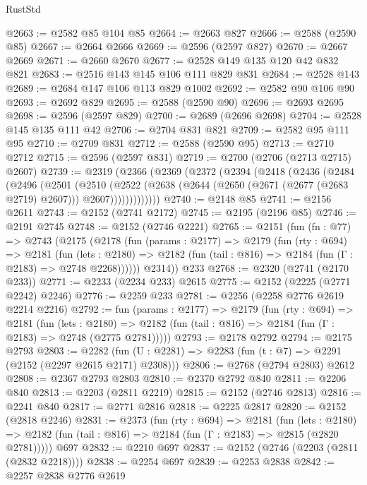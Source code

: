\begin{lexlean}{RustStd}
\begin{coremodule}
@2663 := @2582 @85 @104 @85
@2664 := @2663 @827
@2666 := @2588 (@2590 @85)
@2667 := @2664 @2666
@2669 := @2596 (@2597 @827)
@2670 := @2667 @2669
@2671 := @2660 @2670
@2677 := @2528 @149 @135 @120 @42 @832 @821
@2683 := @2516 @143 @145 @106 @111 @829 @831
@2684 := @2528 @143
@2689 := @2684 @147 @106 @113 @829 @1002
@2692 := @2582 @90 @106 @90
@2693 := @2692 @829
@2695 := @2588 (@2590 @90)
@2696 := @2693 @2695
@2698 := @2596 (@2597 @829)
@2700 := @2689 (@2696 @2698)
@2704 := @2528 @145 @135 @111 @42
@2706 := @2704 @831 @821
@2709 := @2582 @95 @111 @95
@2710 := @2709 @831
@2712 := @2588 (@2590 @95)
@2713 := @2710 @2712
@2715 := @2596 (@2597 @831)
@2719 := @2700 (@2706 (@2713 @2715) @2607)
@2739 := @2319
    (@2366
      (@2369
        (@2372
          (@2394
            (@2418
              (@2436
                (@2484
                  (@2496
                    (@2501
                      (@2510
                        (@2522
                          (@2638
                            (@2644 (@2650 (@2671 (@2677 (@2683 @2719) @2607))) @2607)))))))))))))
@2740 := @2148 @85
@2741 := @2156 @2611
@2743 := @2152 (@2741 @2172)
@2745 := @2195 (@2196 @85)
@2746 := @2191 @2745
@2748 := @2152 (@2746 @2221)
@2765 := @2151
    (fun (fn : @77) =>
    @2743
      (@2175
        (@2178
          (fun (params : @2177) =>
          @2179
            (fun (rty : @694) =>
            @2181
              (fun (lets : @2180) =>
              @2182 (fun (tail : @816) => @2184 (fun (Γ : @2183) => @2748 @2268))))))
        @2314))
    @233
@2768 := @2320 (@2741 (@2170 @233))
@2771 := @2233 (@2234 @233) @2615
@2775 := @2152 (@2225 (@2771 @2242) @2246)
@2776 := @2259 @233
@2781 := @2256 (@2258 @2776 @2619 @2214 @2216)
@2792 := fun (params : @2177) =>
  @2179
    (fun (rty : @694) =>
    @2181
      (fun (lets : @2180) =>
      @2182 (fun (tail : @816) => @2184 (fun (Γ : @2183) => @2748 (@2775 @2781)))))
@2793 := @2178 @2792
@2794 := @2175 @2793
@2803 := @2282 (fun (U : @2281) => @2283 (fun (t : @7) => @2291 (@2152 (@2297 @2615 @2171) @2308)))
@2806 := @2768 (@2794 @2803) @2612
@2808 := @2367 @2793 @2803
@2810 := @2370 @2792 @840
@2811 := @2206 @840
@2813 := @2203 (@2811 @2219)
@2815 := @2152 (@2746 @2813)
@2816 := @2241 @840
@2817 := @2771 @2816
@2818 := @2225 @2817
@2820 := @2152 (@2818 @2246)
@2831 := @2373
    (fun (rty : @694) =>
    @2181
      (fun (lets : @2180) =>
      @2182 (fun (tail : @816) => @2184 (fun (Γ : @2183) => @2815 (@2820 @2781)))))
    @697
@2832 := @2210 @697
@2837 := @2152 (@2746 (@2203 (@2811 (@2832 @2218))))
@2838 := @2254 @697
@2839 := @2253 @2838
@2842 := @2257 @2838 @2776 @2619

\end{coremodule}
\end{lexlean}
